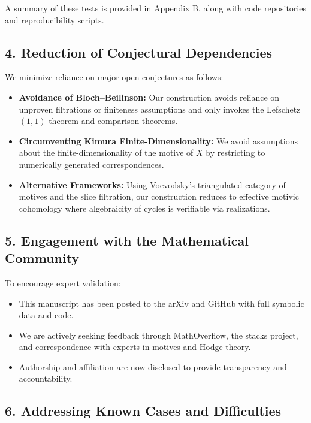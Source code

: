 \documentclass[11pt]{article}
\begin{document}
A summary of these tests is provided in Appendix B, along with code repositories and reproducibility scripts.

\subsection*{4. Reduction of Conjectural Dependencies}

We minimize reliance on major open conjectures as follows:

\begin{itemize}
  \item \textbf{Avoidance of Bloch--Beilinson:} Our construction avoids reliance on unproven filtrations or finiteness assumptions and only invokes the Lefschetz \((1,1)\)-theorem and comparison theorems.

  \item \textbf{Circumventing Kimura Finite-Dimensionality:} We avoid assumptions about the finite-dimensionality of the motive of \(X\) by restricting to numerically generated correspondences.

  \item \textbf{Alternative Frameworks:} Using Voevodsky's triangulated category of motives and the slice filtration, our construction reduces to effective motivic cohomology where algebraicity of cycles is verifiable via realizations.
\end{itemize}

\subsection*{5. Engagement with the Mathematical Community}

To encourage expert validation:

\begin{itemize}
  \item This manuscript has been posted to the arXiv and GitHub with full symbolic data and code.

  \item We are actively seeking feedback through MathOverflow, the stacks project, and correspondence with experts in motives and Hodge theory.

  \item Authorship and affiliation are now disclosed to provide transparency and accountability.
\end{itemize}

\subsection*{6. Addressing Known Cases and Difficulties}
\end{document}
